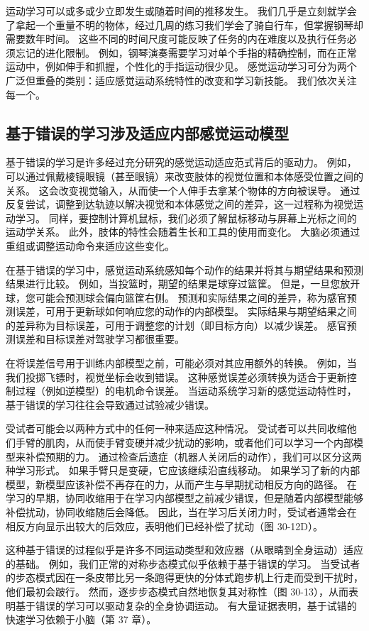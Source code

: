 运动学习可以或多或少立即发生或随着时间的推移发生。 我们几乎是立刻就学会了拿起一个重量不明的物体，经过几周的练习我们学会了骑自行车，但掌握钢琴却需要数年时间。 这些不同的时间尺度可能反映了任务的内在难度以及执行任务必须忘记的进化限制。 例如，钢琴演奏需要学习对单个手指的精确控制，而在正常运动中，例如伸手和抓握，个性化的手指运动很少见。 感觉运动学习可分为两个广泛但重叠的类别：适应感觉运动系统特性的改变和学习新技能。 我们依次关注每一个。

\subsection{基于错误的学习涉及适应内部感觉运动模型}
基于错误的学习是许多经过充分研究的感觉运动适应范式背后的驱动力。 例如，可以通过佩戴棱镜眼镜（甚至眼镜）来改变肢体的视觉位置和本体感受位置之间的关系。 这会改变视觉输入，从而使一个人伸手去拿某个物体的方向被误导。 通过反复尝试，调整到达轨迹以解决视觉和本体感觉之间的差异，这一过程称为视觉运动学习。 同样，要控制计算机鼠标，我们必须了解鼠标移动与屏幕上光标之间的运动学关系。 此外，肢体的特性会随着生长和工具的使用而变化。 大脑必须通过重组或调整运动命令来适应这些变化。

在基于错误的学习中，感觉运动系统感知每个动作的结果并将其与期望结果和预测结果进行比较。 例如，当投篮时，期望的结果是球穿过篮筐。 但是，一旦您放开球，您可能会预测球会偏向篮筐右侧。 预测和实际结果之间的差异，称为感官预测误差，可用于更新球如何响应您的动作的内部模型。 实际结果与期望结果之间的差异称为目标误差，可用于调整您的计划（即目标方向）以减少误差。 感官预测误差和目标误差对驾驶学习都很重要。

在将误差信号用于训练内部模型之前，可能必须对其应用额外的转换。 例如，当我们投掷飞镖时，视觉坐标会收到错误。 这种感觉误差必须转换为适合于更新控制过程（例如逆模型）的电机命令误差。 当运动系统学习新的感觉运动特性时，基于错误的学习往往会导致通过试验减少错误。

受试者可能会以两种方式中的任何一种来适应这种情况。 受试者可以共同收缩他们手臂的肌肉，从而使手臂变硬并减少扰动的影响，或者他们可以学习一个内部模型来补偿预期的力。 通过检查后遗症（机器人关闭后的动作），我们可以区分这两种学习形式。 如果手臂只是变硬，它应该继续沿直线移动。 如果学习了新的内部模型，新模型应该补偿不再存在的力，从而产生与早期扰动相反方向的路径。 在学习的早期，协同收缩用于在学习内部模型之前减少错误，但是随着内部模型能够补偿扰动，协同收缩随后会降低。 因此，当在学习后关闭力时，受试者通常会在相反方向显示出较大的后效应，表明他们已经补偿了扰动（图 30-12D）。

这种基于错误的过程似乎是许多不同运动类型和效应器（从眼睛到全身运动）适应的基础。 例如，我们正常的对称步态模式似乎依赖于基于错误的学习。 当受试者的步态模式因在一条皮带比另一条跑得更快的分体式跑步机上行走而受到干扰时，他们最初会跛行。 然而，逐步步态模式自然地恢复其对称性（图 30-13），从而表明基于错误的学习可以驱动复杂的全身协调运动。 有大量证据表明，基于试错的快速学习依赖于小脑（第 37 章）。

